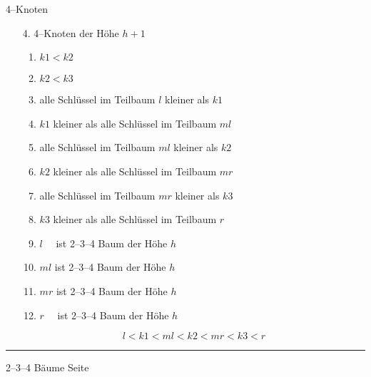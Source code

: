 \begin{slide}{}
\normalsize

\begin{center}
4--Knoten 
\end{center}
\vspace*{0.5cm}

\footnotesize
\begin{enumerate}
\item[4.] 4--Knoten der H\"ohe $h+1$

\hspace*{1cm} 
\begin{enumerate}
\item $k1 < k2$
\item $k2 < k3$
\item alle Schl\"ussel im Teilbaum $l$ kleiner als $k1$
\item $k1$ kleiner als alle Schl\"ussel im Teilbaum $ml$ 
\item alle Schl\"ussel im Teilbaum $ml$ kleiner als $k2$
\item $k2$ kleiner als alle Schl\"ussel im Teilbaum $mr$  
\item alle Schl\"ussel im Teilbaum $mr$ kleiner als $k3$
\item $k3$ kleiner als alle Schl\"ussel im Teilbaum $r$  
\item $l$ \ \, ist 2--3--4 Baum der H\"ohe $h$
\item $ml$  ist 2--3--4 Baum der H\"ohe $h$
\item $mr$  ist 2--3--4 Baum der H\"ohe $h$
\item $r$ \ \, ist 2--3--4 Baum der H\"ohe $h$
\end{enumerate}

$$ l < k1 < ml < k2 < mr < k3 < r $$
\end{enumerate}

\vspace*{\fill}
\tiny \addtocounter{mypage}{1}
\rule{17cm}{1mm}
2--3--4 B\"aume  \hspace*{\fill} Seite 
\end{slide}


